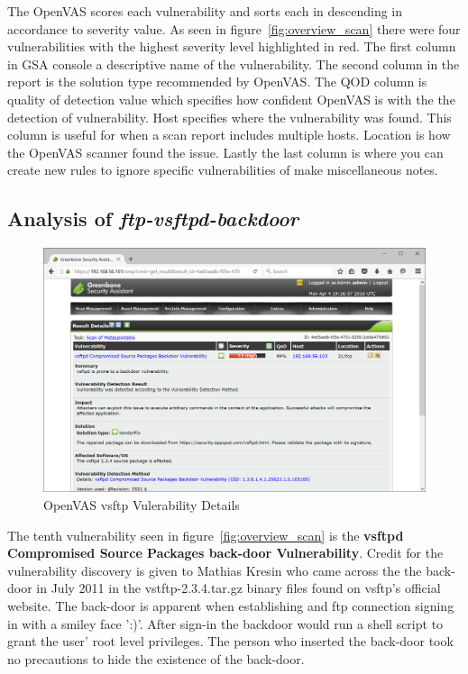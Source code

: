\documentclass[12pt]{article}
\begin{document}
The OpenVAS scores each vulnerability and sorts each  in descending in 
accordance to severity value. As seen in figure~\ref{fig:overview_scan} there 
were four vulnerabilities with the highest severity level highlighted in red. 
The first column in GSA console a descriptive name of the vulnerability. The 
second column in the report is the solution type recommended by OpenVAS. 
The QOD column is quality of detection value which specifies how confident 
OpenVAS is with the the detection of vulnerability. Host specifies where 
the vulnerability was found. This column is useful for when a scan report 
includes multiple hosts. Location is how the OpenVAS scanner found the 
issue. Lastly the last column is where you can create new rules to ignore 
specific vulnerabilities of make miscellaneous notes. 

\subsection{Analysis of \textit{ftp-vsftpd-backdoor}}
\label{sec:vul1}
\begin{figure}[H]
    \centering
    \includegraphics[width=5.5in]{images/20160403-vul1-vsftp.PNG}
    \caption{OpenVAS vsftp Vulerability Details}
    \label{fig:fsftp}
\end{figure}
The tenth vulnerability seen in figure~\ref{fig:overview_scan}
is the \textbf{vsftpd Compromised Source Packages back-door Vulnerability}.
Credit for the vulnerability discovery is given to Mathias Kresin who came 
across the the back-door in July 2011 in the vstftp-2.3.4.tar.gz 
binary files found on vsftp's official website. The back-door is apparent 
when establishing and ftp connection signing in with a smiley face ':)'. 
After sign-in the backdoor would run a shell script to grant the user'
root level privileges. The person who inserted the back-door took no 
precautions to hide the existence of the back-door. 
\end{document}
